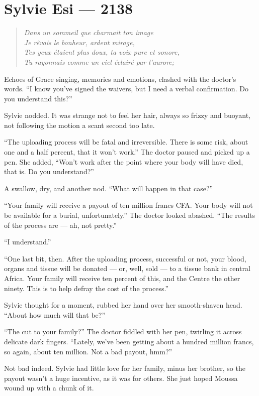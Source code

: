 \chapter*{Sylvie Esi — 2138}

\begin{quote}
\emph{Dans un sommeil que charmait ton image\\
Je rêvais le bonheur, ardent mirage,\\
Tes yeux étaient plus doux, ta voix pure et sonore,\\
Tu rayonnais comme un ciel éclairé par l'aurore;}
\end{quote}

Echoes of Grace singing, memories and emotions, clashed with the doctor's words. ``I know you've signed the waivers, but I need a verbal confirmation. Do you understand this?''

Sylvie nodded. It was strange not to feel her hair, always so frizzy and buoyant, not following the motion a scant second too late.

``The uploading process will be fatal and irreversible. There is some risk, about one and a half percent, that it won't work.'' The doctor paused and picked up a pen. She added, ``Won't work after the point where your body will have died, that is. Do you understand?''

A swallow, dry, and another nod. ``What will happen in that case?''

``Your family will receive a payout of ten million francs CFA. Your body will not be available for a burial, unfortunately.'' The doctor looked abashed. ``The results of the process are --- ah, not pretty.''

``I understand.''

``One last bit, then. After the uploading process, successful or not, your blood, organs and tissue will be donated --- or, well, sold --- to a tissue bank in central Africa. Your family will receive ten percent of this, and the Centre the other ninety. This is to help defray the cost of the process.''

Sylvie thought for a moment, rubbed her hand over her smooth-shaven head. ``About how much will that be?''

``The cut to your family?'' The doctor fiddled with her pen, twirling it across delicate dark fingers. ``Lately, we've been getting about a hundred million francs, so again, about ten million. Not a bad payout, hmm?''

Not bad indeed. Sylvie had little love for her family, minus her brother, so the payout wasn't a huge incentive, as it was for others. She just hoped Moussa wound up with a chunk of it.

